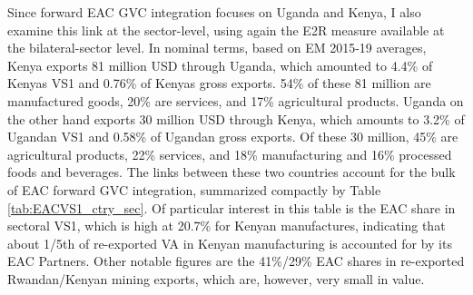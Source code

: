 \documentclass[a4paper]{article}
\begin{document}
Since forward EAC GVC integration focuses on Uganda and Kenya, I also examine this link at the sector-level, using again the E2R measure available at the bilateral-sector level. In nominal terms, based on EM 2015-19 averages, Kenya exports 81 million USD through Uganda, which amounted to 4.4\% of Kenyas VS1 and 0.76\% of Kenyas gross exports. 54\% of these 81 million are manufactured goods, 20\% are services, and 17\% agricultural products. Uganda on the other hand exports 30 million USD through Kenya, which amounts to 3.2\% of Ugandan VS1 and 0.58\% of Ugandan gross exports. Of these 30 million, 45\% are agricultural products, 22\% services, and 18\% manufacturing and 16\% processed foods and beverages. The links between these two countries account for the bulk of EAC forward GVC integration, summarized compactly by Table \ref{tab:EACVS1_ctry_sec}. Of particular interest in this table is the EAC share in sectoral VS1, which is high at 20.7\% for Kenyan manufactures, indicating that about 1/5th of re-exported VA in Kenyan manufacturing is accounted for by its EAC Partners. Other notable figures are the 41\%/29\% EAC shares in re-exported Rwandan/Kenyan mining exports, which are, however, very small in value. 
\end{document}
